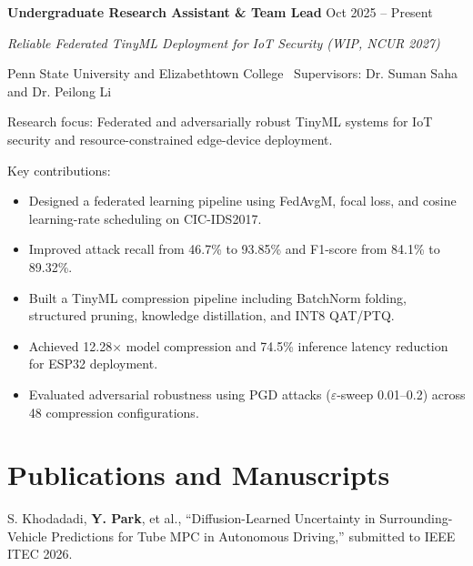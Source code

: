 \documentclass[11pt,a4paper]{article}
\begin{document}
\vspace{0.5em}

\textbf{Undergraduate Research Assistant \& Team Lead} \hfill Oct 2025 -- Present

\textit{Reliable Federated TinyML Deployment for IoT Security (WIP, NCUR 2027)} \

Penn State University and Elizabethtown College \
Supervisors: Dr. Suman Saha and Dr. Peilong Li

\vspace{0.3em}

Research focus:
Federated and adversarially robust TinyML systems for IoT security and resource-constrained edge-device deployment.

\vspace{0.3em}

Key contributions:

\begin{itemize}[leftmargin=1.5em]

\item Designed a federated learning pipeline using FedAvgM, focal loss, and cosine learning-rate scheduling on CIC-IDS2017.

\item Improved attack recall from 46.7\% to 93.85\% and F1-score from 84.1\% to 89.32\%.

\item Built a TinyML compression pipeline including BatchNorm folding, structured pruning, knowledge distillation, and INT8 QAT/PTQ.

\item Achieved 12.28$\times$ model compression and 74.5\% inference latency reduction for ESP32 deployment.

\item Evaluated adversarial robustness using PGD attacks (\(\varepsilon\)-sweep 0.01--0.2) across 48 compression configurations.

\end{itemize}


\section*{Publications and Manuscripts}

S. Khodadadi, \textbf{Y. Park}, et al., ``Diffusion-Learned Uncertainty in Surrounding-Vehicle Predictions for Tube MPC in Autonomous Driving,'' submitted to IEEE ITEC 2026.
\end{document}
